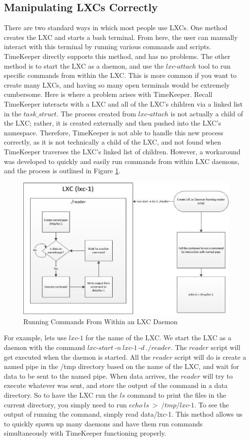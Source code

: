 \subsection{Manipulating LXCs Correctly}
There are two standard ways in which most people use LXCs. One method creates the LXC and starts a bash terminal. From here, the user can manually interact with this terminal by running various commands and scripts. TimeKeeper directly supports this method, and has no problems. The other method is to start the LXC as a daemon, and use the $lxc$-$attach$ tool to run specific commands from within the LXC. This is more common if you want to create many LXCs, and having so many open terminals would be extremely cumbersome. Here is where a problem arises with TimeKeeper. Recall TimeKeeper interacts with a LXC and all of the LXC's children via a linked list in the $task\_struct$. The process created from $lxc$-$attach$ is not actually a child of the LXC; rather, it is created externally and then pushed into the LXC's namespace. Therefore, TimeKeeper is not able to handle this new process correctly, as it is not technically a child of the LXC, and not found when TimeKeeper traverses the LXC's linked list of children. However, a workaround was developed to quickly and easily run commands from within LXC daemons, and the process is outlined in Figure \ref{fig:lxc_commands}. 
\begin{figure}[t] 
      \includegraphics[width=\textwidth]{images/lxc_commands.eps} 
    \caption{Running Commands From Within an LXC Daemon} 
    \label{fig:lxc_commands}
  \end{figure}
For example, lets use $lxc$-$1$ for the name of the LXC. We start the LXC as a daemon with the command $lxc$-$start\ $-$n\ lxc$-$1\ $-$d\ ./reader$. The $reader$ script will get executed when the daemon is started. All the $reader$ script will do is create a named pipe in the /tmp directory based on the name of the LXC, and wait for data to be sent to the named pipe. When data arrives, the $reader$ will try to execute whatever was sent, and store the output of the command in a data directory. So to have the LXC run the $ls$ command to print the files in the current directory, you simply need to run $echo\ ls\ >\ /tmp/lxc$-$1$. To see the output of running the command, simply read data/lxc-1. This method allows us to quickly spawn up many daemons and have them run commands simultaneously with TimeKeeper functioning properly.
